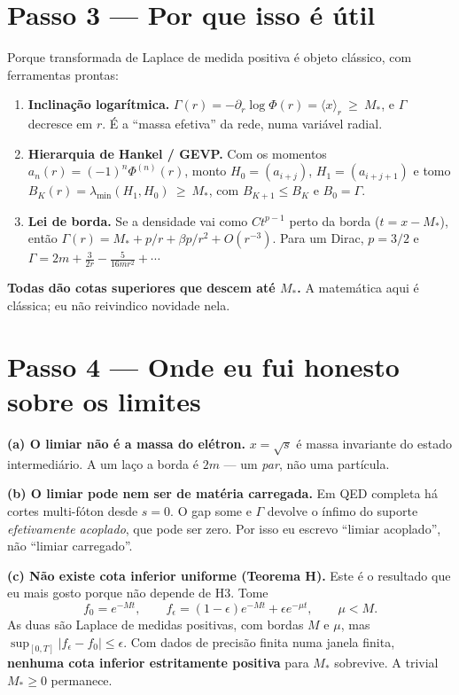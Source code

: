 \documentclass[11pt,a4paper]{article}
\newcommand{\Mst}{M_*}
\begin{document}
\section*{Passo 3 --- Por que isso é útil}

Porque transformada de Laplace de medida positiva é objeto clássico, com
ferramentas prontas:

\begin{enumerate}[leftmargin=7mm,itemsep=3pt]
\item \textbf{Inclinação logarítmica.} $\Gamma(r)=-\partial_r\log\Phi(r)
  =\langle x\rangle_r \ \ge\ \Mst$, e $\Gamma$ decresce em $r$. É a ``massa
  efetiva'' da rede, numa variável radial.
\item \textbf{Hierarquia de Hankel / GEVP.} Com os momentos
  $a_n(r)=(-1)^n\Phi^{(n)}(r)$, monto $H_0=(a_{i+j})$, $H_1=(a_{i+j+1})$ e
  tomo $B_K(r)=\lambda_{\min}(H_1,H_0)\ \ge\ \Mst$, com
  $B_{K+1}\le B_K$ e $B_0=\Gamma$.
\item \textbf{Lei de borda.} Se a densidade vai como $C t^{p-1}$ perto da
  borda ($t=x-\Mst$), então
  $\Gamma(r)=\Mst+p/r+\beta p/r^2+O(r^{-3})$. Para um Dirac, $p=3/2$ e
  $\Gamma=2m+\tfrac{3}{2r}-\tfrac{5}{16mr^2}+\cdots$
\end{enumerate}

\textbf{Todas dão cotas superiores que descem até $\Mst$.} A matemática aqui é
clássica; eu não reivindico novidade nela.

\section*{Passo 4 --- Onde eu fui honesto sobre os limites}

\textbf{(a) O limiar não é a massa do elétron.} $x=\sqrt{s}$ é massa invariante
do estado intermediário. A um laço a borda é $2m$ --- um \emph{par}, não uma
partícula.

\textbf{(b) O limiar pode nem ser de matéria carregada.} Em QED completa há
cortes multi-fóton desde $s=0$. O gap some e $\Gamma$ devolve o ínfimo do
suporte \emph{efetivamente acoplado}, que pode ser zero. Por isso eu escrevo
``limiar acoplado'', não ``limiar carregado''.

\textbf{(c) Não existe cota inferior uniforme (Teorema H).} Este é o resultado
que eu mais gosto porque não depende de H3. Tome
\[
  f_0=e^{-Mt},\qquad f_\epsilon=(1-\epsilon)e^{-Mt}+\epsilon e^{-\mu t},
  \qquad \mu<M .
\]
As duas são Laplace de medidas positivas, com bordas $M$ e $\mu$, mas
$\sup_{[0,T]}|f_\epsilon-f_0|\le\epsilon$. Com dados de precisão finita numa
janela finita, \textbf{nenhuma cota inferior estritamente positiva} para $\Mst$
sobrevive. A trivial $\Mst\ge0$ permanece.
\end{document}
